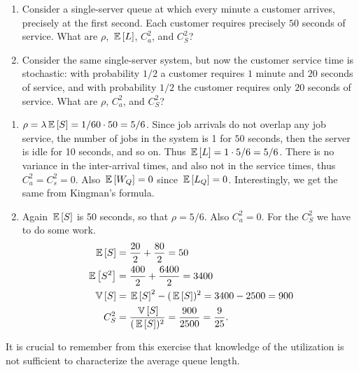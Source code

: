 \begin{question}
  \begin{enumerate}
  \item Consider a single-server queue at which every minute a
    customer arrives, precisely at the first second. Each customer
    requires precisely $50$ seconds of service. 
What are $\rho$,
    $\,\mathbb{E}\left[L\right]$, $C_a^2$, and $C_S^2$?
  \item Consider the same single-server system, but now the customer
    service time is stochastic: with probability $1/2$ a customer
    requires $1$ minute and $20$ seconds of service, and with
    probability $1/2$ the customer requires only $20$ seconds of
    service.  What are $\rho$, $C_a^2$, and $C_S^2$?
  \end{enumerate}
  \begin{solution}
    \begin{enumerate}
    \item $\rho = \lambda \,\mathbb{E}\left[S\right] = 1/60 \cdot 50 = 5/6$. Since job
      arrivals do not overlap any job service, the number of jobs in
      the system is 1 for $50$ seconds, then the server is idle for 10
      seconds, and so on. Thus $\,\mathbb{E}\left[L\right] = 1\cdot5/6 = 5/6$. There is no
      variance in the inter-arrival times, and also not in the service
      times, thus $C_a^2 = C_s^2 = 0$. Also $\,\mathbb{E}\left[W_Q\right]=0$ since
      $\,\mathbb{E}\left[L_Q\right]=0$. Interestingly, we get the same from Kingman's formula.
    \item Again $\,\mathbb{E}\left[S\right]$ is 50 seconds, so that $\rho = 5/6$. Also
      $C_a^2=0$. For the $C_S^2$ we have to do some work. 
      \begin{equation*}
        \begin{split}
          \,\mathbb{E}\left[S\right] &=  \frac{20}2 + \frac{80}2 = 50 \\
          \,\mathbb{E}\left[S^2\right] &=  \frac{400}2 + \frac{6400} 2 = 3400 \\
          \,\mathbb{V}\left[S\right] &=  \,\mathbb{E}\left[S\right]^2 - (\,\mathbb{E}\left[S\right])^2 = 3400 - 2500 = 900 \\
          C_S^2 &=  \frac{\,\mathbb{V}\left[S\right]}{(\,\mathbb{E}\left[S\right])^2} = \frac{900}{2500}=\frac{9}{25}.
        \end{split}
      \end{equation*}
    \end{enumerate}
  It is crucial to remember from this exercise that knowledge of the
  utilization is not sufficient to characterize the average queue
  length.
  \end{solution}
\end{question}

